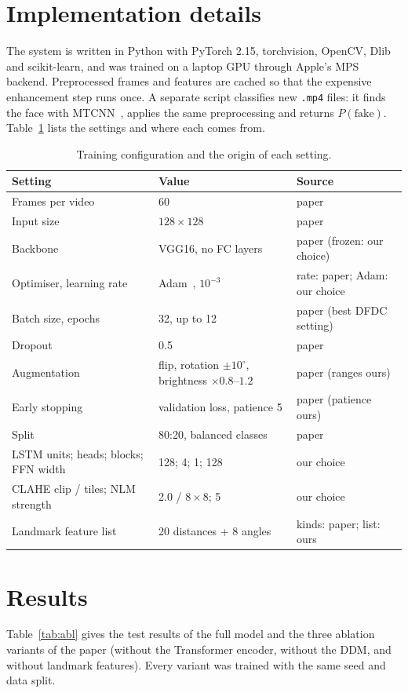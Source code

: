 \documentclass[11pt,a4paper]{article}
\begin{document}
\section{Implementation details}
The system is written in Python with PyTorch 2.15, torchvision, OpenCV, Dlib and scikit-learn, and was trained on a laptop GPU through Apple's MPS backend. Preprocessed frames and features are cached so that the expensive enhancement step runs once. A separate script classifies new \texttt{.mp4} files: it finds the face with MTCNN~\cite{mtcnn}, applies the same preprocessing and returns $P(\text{fake})$. Table~\ref{tab:cfg} lists the settings and where each comes from.

\begin{table}[H]
\centering\small
\caption{Training configuration and the origin of each setting.}
\label{tab:cfg}
\begin{tabular}{@{}p{4.9cm}p{5.6cm}p{4.9cm}@{}}
\toprule
Setting & Value & Source\\
\midrule
Frames per video & 60 & paper\\
Input size & $128\times128$ & paper\\
Backbone & VGG16, no FC layers & paper (frozen: our choice)\\
Optimiser, learning rate & Adam~\cite{adam}, $10^{-3}$ & rate: paper; Adam: our choice\\
Batch size, epochs & 32, up to 12 & paper (best DFDC setting)\\
Dropout & 0.5 & paper\\
Augmentation & flip, rotation $\pm10^\circ$, brightness $\times0.8$--$1.2$ & paper (ranges ours)\\
Early stopping & validation loss, patience 5 & paper (patience ours)\\
Split & 80:20, balanced classes & paper\\
LSTM units; heads; blocks; FFN width & 128; 4; 1; 128 & our choice\\
CLAHE clip / tiles; NLM strength & 2.0 / $8\times8$; 5 & our choice\\
Landmark feature list & 20 distances + 8 angles & kinds: paper; list: ours\\
\bottomrule
\end{tabular}
\end{table}

\section{Results}
Table~\ref{tab:abl} gives the test results of the full model and the three ablation variants of the paper (without the Transformer encoder, without the DDM, and without landmark features). Every variant was trained with the same seed and data split.
\end{document}
